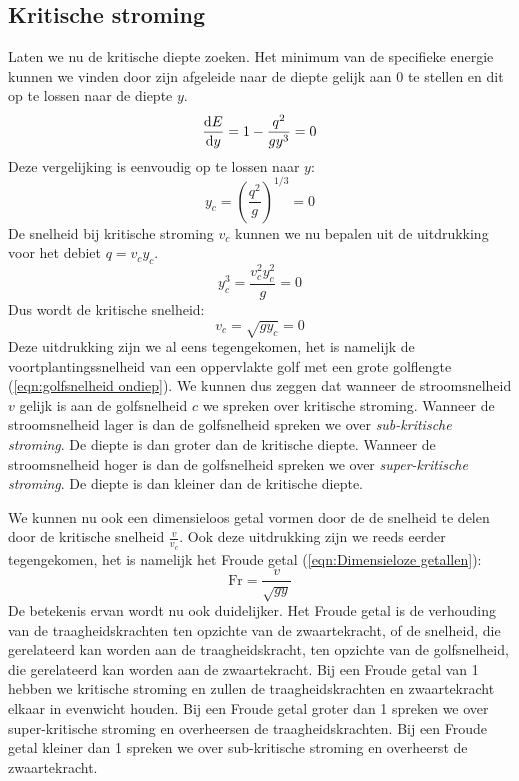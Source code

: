 		\subsection{Kritische stroming}
Laten we nu de kritische diepte zoeken. Het minimum van de specifieke energie kunnen we vinden door zijn afgeleide naar de diepte gelijk aan 0 te stellen en dit op te lossen naar de diepte $y$.
\begin{equation}
	\frac{\mathrm{d} E}{\mathrm{d} y} = 1 - \frac{q^2}{g y^3} = 0
\end{equation}
Deze vergelijking is eenvoudig op te lossen naar $y$:
\begin{equation}
	y_c = \left( \frac{q^2}{g} \right)^{1/3} = 0
\end{equation}
De snelheid bij kritische stroming $v_c$ kunnen we nu bepalen uit de uitdrukking voor het debiet $q = v_c y_c$. 
\begin{equation}
	y_c^3 = \frac{v_c^2 y_c^2}{g} = 0
\end{equation}
Dus wordt de kritische snelheid:
\begin{equation}
	v_c = \sqrt{g y_c} = 0
\end{equation}
Deze uitdrukking zijn we al eens tegengekomen, het is namelijk de voortplantingssnelheid van een oppervlakte golf met een grote golflengte (\ref{eqn:golfsnelheid ondiep}). We kunnen dus zeggen dat wanneer de stroomsnelheid  $v$ gelijk is aan de golfsnelheid $c$ we spreken over kritische stroming. Wanneer de stroomsnelheid lager is dan de golfsnelheid spreken we over \emph{sub-kritische stroming}. De diepte is dan groter dan de kritische diepte.  Wanneer de stroomsnelheid hoger is dan de golfsnelheid spreken we over \emph{super-kritische stroming}.  De diepte is dan kleiner dan de kritische diepte.

We kunnen nu ook een dimensieloos getal vormen door de de snelheid te delen door de kritische snelheid $\frac{v}{v_c}$. Ook deze uitdrukking zijn we reeds eerder tegengekomen, het is namelijk het Froude getal (\ref{eqn:Dimensieloze getallen}):
\begin{equation}
	\text{Fr} = \dfrac{v}{\sqrt{g y}}
\end{equation}
De betekenis ervan wordt nu ook duidelijker. Het Froude getal is de verhouding van de traagheidskrachten ten opzichte van de zwaartekracht, of de snelheid, die gerelateerd kan worden aan de traagheidskracht, ten opzichte van de golfsnelheid, die gerelateerd kan worden aan de zwaartekracht. Bij een Froude getal van 1 hebben we kritische stroming en zullen de traagheidskrachten en zwaartekracht elkaar in evenwicht houden. Bij een Froude getal groter dan 1 spreken we over super-kritische stroming en overheersen de traagheidskrachten. Bij een Froude getal kleiner dan 1 spreken we over sub-kritische stroming en overheerst de zwaartekracht.

